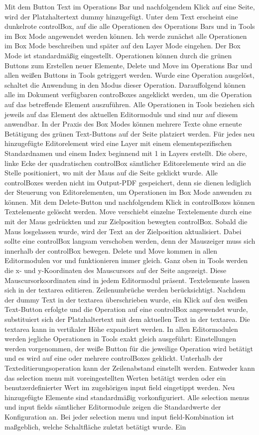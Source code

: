 Mit dem Button Text im Operations Bar und nachfolgendem Klick auf eine Seite, wird der Platzhaltertext dummy hinzugefügt. Unter dem Text erscheint eine dunkelrote controlBox, auf die alle Operationen des Operations Bars und in Tools im Box Mode angewendet werden können. Ich werde zunächst alle Operationen im Box Mode beschreiben und später auf den Layer Mode eingehen. Der Box Mode ist standardmäßig eingestellt. Operationen können durch die grünen Buttons zum Erstellen neuer Elemente, Delete und Move im Operations Bar und allen weißen Buttons in Tools getriggert werden. Wurde eine Operation ausgelöst, schaltet die Anwendung in den Modus dieser Operation. Darauffolgend können alle im Dokument verfügbaren controBoxes angeklickt werden, um die Operation auf das betreffende Element auszuführen. Alle Operationen in Tools beziehen sich jeweils auf das Element des aktuellen Editormoduls und sind nur auf diesem anwendbar. In der Praxis des Box Modes können mehrere Texte ohne erneute Betätigung des grünen Text-Buttons auf der Seite platziert werden. Für jedes neu hinzugefügte Editorelement wird eine Layer mit einem elementspezifischen Standardnamen und einem Index beginnend mit 1 in Layers erstellt. Die obere, linke Ecke der quadratischen controlBox sämtlicher Editorelemente wird an die Stelle positioniert, wo mit der Maus auf die Seite geklickt wurde. Alle controlBoxes werden nicht im Output-PDF gespeichert, denn sie dienen lediglich der Steuerung von Editorelementen, um Operationen im Box Mode anwenden zu können. Mit dem Delete-Button und nachfolgendem Klick in controlBoxes können Textelemente gelöscht werden. Move verschiebt einzelne Textelemente durch eine mit der Maus gedrückten und zur Zielposition bewegten controlBox. Sobald die Maus losgelassen wurde, wird der Text an der Zielposition aktualisiert. Dabei sollte eine controlBox langsam verschoben werden, denn der Mauszeiger muss sich innerhalb der controlBox bewegen. Delete und Move kommen in allen Editormodulen vor und funktionieren immer gleich. Ganz oben in Tools werden die x- und y-Koordinaten des Mauscursors auf der Seite angezeigt. Diese Mauscursorkoordinaten sind in jedem Editormodul präsent. Textelemente lassen sich in der textarea editieren. Zeilenumbrüche werden berücksichtigt. Nachdem der dummy Text in der textarea überschrieben wurde, ein Klick auf den weißen Text-Button erfolgte und die Operation auf eine controlBox angewendet wurde, substituiert sich der Platzhaltertext mit dem aktuellen Text in der textarea. Die textarea kann in vertikaler Höhe expandiert werden. In allen Editormodulen werden jegliche Operationen in Tools exakt gleich ausgeführt: Einstellungen werden vorgenommen, der weiße Button für die jeweilige Operation wird betätigt und es wird auf eine oder mehrere controlBoxes geklickt. Unterhalb der Texteditierungsoperation kann der Zeilenabstand einstellt werden. Entweder kann das selection menu mit voreingestellten Werten betätigt werden oder ein benutzerdefinierter Wert im zugehörigen input field eingetippt werden. Neu hinzugefügte Elemente sind standardmäßig vorkonfiguriert. Alle selection menus und input fields sämtlicher Editormodule zeigen die Standardwerte der Konfiguration an. Bei jeder selection menu und input field-Kombination ist maßgeblich, welche Schaltfläche zuletzt betätigt wurde. Ein 